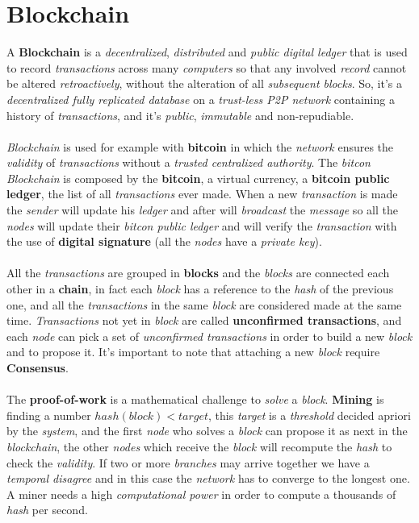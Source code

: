 \documentclass{article}
\begin{document}
\section{Blockchain}
A \textbf{Blockchain} is a \emph{decentralized}, \emph{distributed} and \emph{public digital ledger} that is used to record \emph{transactions} across many \emph{computers} so that any involved \emph{record} cannot be altered \emph{retroactively}, without the alteration of all \emph{subsequent blocks}. So, it's a \emph{decentralized fully replicated database} on a \emph{trust-less P2P network} containing a history of \emph{transactions}, and it's \emph{public}, \emph{immutable} and non-repudiable.\\\\
\emph{Blockchain} is used for example with \textbf{bitcoin} in which the \emph{network} ensures the \emph{validity} of \emph{transactions} without a \emph{trusted centralized authority}. The \emph{bitcon Blockchain} is composed by the \textbf{bitcoin}, a virtual currency, a \textbf{bitcoin public ledger}, the list of all \emph{transactions} ever made. When a new \emph{transaction} is made the \emph{sender} will update his \emph{ledger} and after will \emph{broadcast} the \emph{message} so all the \emph{nodes} will update their \emph{bitcon public ledger} and will verify the \emph{transaction} with the use of \textbf{digital signature} (all the \emph{nodes} have a \emph{private key}). \\\\
All the \emph{transactions} are grouped in \textbf{blocks} and the \emph{blocks} are connected each other in a \textbf{chain}, in fact each \emph{block} has a reference to the \emph{hash} of the previous one, and all the \emph{transactions} in the same \emph{block} are considered made at the same time. \emph{Transactions} not yet in \emph{block} are called \textbf{unconfirmed transactions}, and each \emph{node} can pick a set of \emph{unconfirmed transactions} in order to build a new \emph{block} and to propose it. It's important to note that attaching a new \emph{block} require \textbf{Consensus}. \\\\
The \textbf{proof-of-work} is a mathematical challenge to \emph{solve} a \emph{block}. \textbf{Mining} is finding a number $hash(block) < target$, this \emph{target} is a \emph{threshold} decided apriori by the \emph{system}, and the first \emph{node} who solves a \emph{block} can propose it as next in the \emph{blockchain}, the other \emph{nodes} which receive the \emph{block} will recompute the \emph{hash} to check the \emph{validity}. If two or more \emph{branches} may arrive together we have a \emph{temporal disagree} and in this case the \emph{network} has to converge to the longest one. A miner needs a high \emph{computational power} in order to compute a thousands of \emph{hash} per second.\\\\
\end{document}

